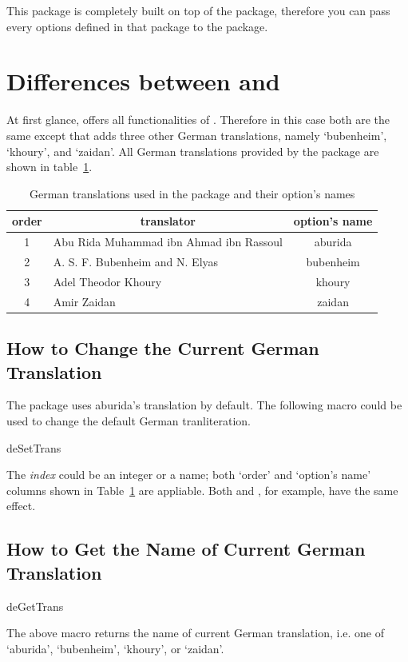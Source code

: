 \documentclass[a4paper]{ltxdoc}
\begin{document}
This package is completely built on top of the  package, therefore you can pass every options
defined in that package to the  package. 

\section{Differences between  and }
At first glance,   offers all functionalities of . Therefore in this case 
both are the same except that  adds three other German translations, namely `bubenheim', `khoury', and `zaidan'. All German translations 
provided by the package are shown in table~\ref{tab:detrans}.

\begin{table}[!htbp]
\centering
\begin{tabular}{|c|l|c|}
    \toprule
    order & \multicolumn{1}{c|}{translator} & option's name \\\midrule
    1 & Abu Rida Muhammad ibn Ahmad ibn Rassoul & aburida \\
    2 & A. S. F. Bubenheim and N. Elyas & bubenheim \\
    3 & Adel Theodor Khoury & khoury \\
    4 & Amir Zaidan & zaidan \\
    \bottomrule
\end{tabular}
    \caption{German translations used in the package and their option's names}
    \label{tab:detrans}
\end{table}

\subsection{How to Change the Current German Translation}
    The  package uses aburida's translation by default. 
    The following macro could be used to change the default German tranliteration. 
    \begin{declcs}{deSetTrans}
    \end{declcs}    
    The \textit{index} could be an integer or a name; both `order' and `option's name' columns
    shown in Table~\ref{tab:detrans} are appliable. Both  and , for example,
    have the same effect. 
    
\subsection{How to Get the Name of Current German Translation}
    \begin{declcs}{deGetTrans}
    \end{declcs}    
    The above macro returns the name of current German translation, i.e.  one of `aburida', `bubenheim', `khoury', or `zaidan'.
\end{document}

